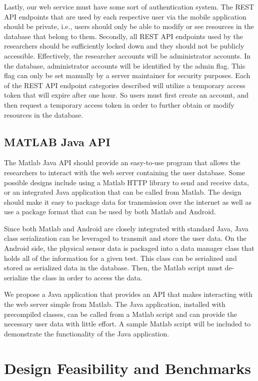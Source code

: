 \documentclass[conference]{IEEEtran}
\begin{document}
Lastly, our web service must have some sort of authentication system. The REST API endpoints that are used by each respective user via the mobile application should be private, i.e., users should only be able to modify or see resources in the database that belong to them. Secondly, all REST API endpoints used by the researchers should be sufficiently locked down and they should not be publicly accessible. Effectively, the researcher accounts will be administrator accounts. In the database, administrator accounts will be identified by the admin flag. This flag can only be set manually by a server maintainer for security purposes. Each of the REST API endpoint categories described will utilize a temporary access token that will expire after one hour. So users must first create an account, and then request a temporary access token in order to further obtain or modify resources in the database.

\subsection{MATLAB Java API}
The Matlab Java API should provide an easy-to-use program that allows the researchers to interact with the web server containing the user database. Some possible designs include using a Matlab HTTP library to send and receive data, or an integrated Java application that can be called from Matlab. The design should make it easy to package data for transmission over the internet as well as use a package format that can be used by both Matlab and Android. 

Since both Matlab and Android are closely integrated with standard Java, Java class serialization can be leveraged to transmit and store the user data. On the Android side, the physical sensor data is packaged into a data manager class that holds all of the information for a given test. This class can be serialized and stored as serialized data in the database. Then, the Matlab script must de-serialize the class in order to access the data. 

We propose a Java application that provides an API that makes interacting with the web server simple from Matlab. The Java application, installed with precompiled classes, can be called from a Matlab script and can provide the necessary user data with little effort. A sample Matlab script will be included to demonstrate the functionality of the Java application.

\section{Design Feasibility and Benchmarks}
\end{document}
